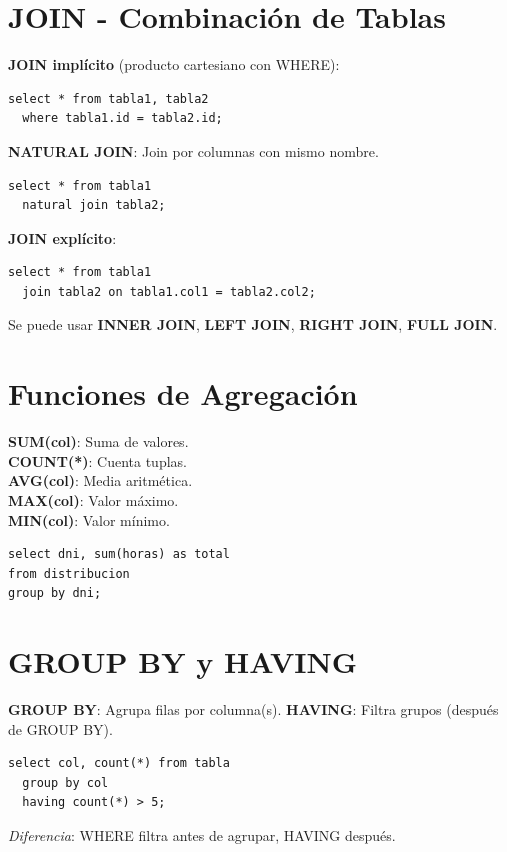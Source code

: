 \documentclass[8pt,a4paper,twocolumn]{article}
\begin{document}
\section{JOIN - Combinación de Tablas}

\textbf{JOIN implícito} (producto cartesiano con WHERE):
\begin{lstlisting}
select * from tabla1, tabla2
  where tabla1.id = tabla2.id;
\end{lstlisting}

\textbf{NATURAL JOIN}: Join por columnas con mismo nombre.
\begin{lstlisting}
select * from tabla1 
  natural join tabla2;
\end{lstlisting}

\textbf{JOIN explícito}:
\begin{lstlisting}
select * from tabla1 
  join tabla2 on tabla1.col1 = tabla2.col2;
\end{lstlisting}
Se puede usar \textbf{INNER JOIN}, \textbf{LEFT JOIN}, \textbf{RIGHT JOIN}, \textbf{FULL JOIN}.

\section{Funciones de Agregación}

\textbf{SUM(col)}: Suma de valores.\\
\textbf{COUNT(*)}: Cuenta tuplas.\\
\textbf{AVG(col)}: Media aritmética.\\
\textbf{MAX(col)}: Valor máximo.\\
\textbf{MIN(col)}: Valor mínimo.

\begin{lstlisting}
select dni, sum(horas) as total
from distribucion
group by dni;
\end{lstlisting}

\section{GROUP BY y HAVING}

\textbf{GROUP BY}: Agrupa filas por columna(s).
\textbf{HAVING}: Filtra grupos (después de GROUP BY).
\begin{lstlisting}
select col, count(*) from tabla
  group by col
  having count(*) > 5;
\end{lstlisting}

\textit{Diferencia}: WHERE filtra antes de agrupar, HAVING después.
\end{document}

